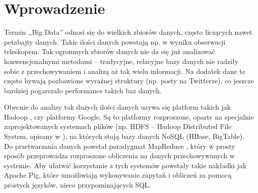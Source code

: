 \section{Wprowadzenie}
\label{sec:Wprowadzenie}

Termin ,,Big Data'' odnosi się do wielkich zbiorów danych, często liczących nawet petabajty danych. Takie ilości danych powstają np. w wyniku obserwacji teleskopem. Tak ogromnych zbiorów danych nie da się już analizować konwencjonalnymi metodami -- tradycyjne, relacyjne bazy danych nie radziły sobie z przechowywaniem i analizą aż tak wielu informacji. Na dodatek dane te często bywają pozbawione wyraźnej struktury (np. posty na Twitterze), co jeszcze bardziej pogarszało performance takich baz danych.

Obecnie do analizy tak dużych ilości danych uzywa się platform takich jak Hadoop \cite{apache:hadoop}, czy platformy Google. Są to platformy rozproszone, oparte na specjalnie zaprojektowanych systemach plików (np. HDFS -- Hadoop Distributed File System, opisany w \cite{shvachko10}), na których stoją bazy danych NoSQL (HBase, BigTable). Do przetwarzania danych powstał paradygmat MapReduce \cite{dean08}, który w prosty sposób przeprowadza rozproszone obliczenia na danych przechowywanych w systemie. Aby ułatwić korzystanie z tych systemów powstały takie nakładki jak Apache Pig, które umożliwiają wykonywanie zapytań i obliczeń za pomocą prostych języków, nieco przypominających SQL.

